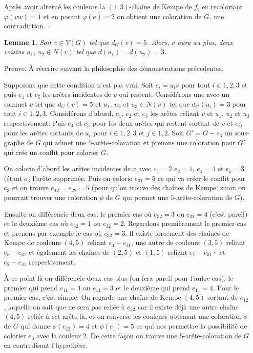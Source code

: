 \documentclass[10pt,a4paper]{article}
\newtheorem{lemme}{Lemme}
\newcommand{\ep}{{\hfill $\square$}}
\begin{document}
Après avoir alterné les couleurs la $(1,3)$-chaîne de Kempe de $f$, en recoloriant $\varphi(vw)=1$ et en posant $\varphi(e)=2$ on obtient une coloration de $G$, une contradiction. \ep

\begin{lemme}
Soit $v \in V(G)$ tel que $d_G(v) = 5$. Alors, $v$ aura au plus, deux voisins $u_1$, $u_2 \in N(v)$ tel que $d(u_1) = d(u_2) = 3$.
\label{le:5333}
\end{lemme}


Preuve.
{\color{blue} À réecrire suivant la philosophie des démonstrations précedentes.}

Supposons que cette condition n'est pas vrai. Soit $e_i = u_iv$ pour tout $i \in {1,2,3}$ et puis $e_4$ et $e_5$ les arêtes incidentes de $v$ qui restent. Considérons une  avec un sommet $v$ tel que $d_G(v) = 5$ et $u_1$, $u_2$ et $u_3 \in N(v)$ tel que $d_G(u_i) = 3$ pour tout $i \in {1,2,3}$. Considérons d'abord, $e_1$, $e_2$ et $e_3$ les arêtes reliant $v$ et $u_1$, $u_2$ et $u_3$ respectivement. Puis $e_4$ et $e_5$ pour les deux arêtes qui restent sortant de $v$ et $e_{ij}$ pour les arêtes sortants de $u_i$ pour $i \in {1,2,3}$ et $ j \in {1,2}$. Soit $G' = G- e_3$ un sous-graphe de $G$ qui admet une $5$-arête-coloration et prenons une coloration pour $G'$ qui crée un conflit pour colorier $G$. 

On colorie d'abord les arêtes incidentes de $v$ avec $e_1 = 2$ $e_2 = 1$, $e_4 = 4$ et $e_5 = 3$ (étant $e_3$ l'arête supprimée. Puis on colorie $e_{31} = 5$ ce qui va créer le conflit pour $e_3$ et on trouve $e_{12} = e_{22} = 5$ (pour qu'on trouve des chaînes de Kempe; sinon on pourrait trouver une coloration $\phi$ de $G$ qui permet une $5$-arête-coloration de $G$). 

Ensuite on différencie deux cas. le premier cas où $e_{32} = 3$ ou $e_{32} = 4$ (c'est pareil) et le deuxième cas où $e_{32} = 1$ ou $e_{32} = 2$. Regardons premièrement le premier cas et prenons par exemple le cas où $e_{32} = 3$. Il existe forcement des chaînes de Kempe de couleurs $(4,5)$ reliant $e_4 -e_{31}$, une autre de couleurs $(3,5)$ reliant $e_5 -e_{31}$ et également les chaînes de $(2,5)$ et $(1,5)$ reliant $e_1 -e_{31}$· et $e_2 -e_{31}$ respectivement. 

À ce point là on différencie deux cas plus (on fera pareil pour l'autre cas), le premier qui prend $e_{11} = 1$ ou $e_{11} = 3$ et le deuxième qui prend $e_{11} = 4$. Pour le premier cas, c'est simple. On regarde une chaîne de Kempe $(4,5)$ sortant de $e_{12}$, laquelle on sait que ne sera pas reliée à $e_{32}$ car il existe déjà une autre chaîne $(4,5)$ reliée à cet arête-là, et on renverse les couleurs obtenant une coloration $\phi$ de $G$ qui donne $\phi (e_{12}) = 4$ et $\phi(e_1) = 5$ ce qui nos permettre la possibilité de colorier $e_3$ avec la couleur $2$. De cette façon on trouve une $5$-arête-coloration de $G$ en contredisant l'hypothèse. 
\end{document}
